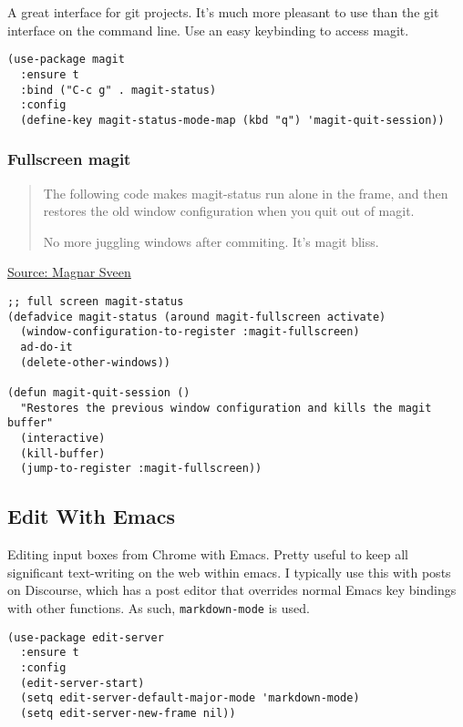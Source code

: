 \documentclass[11pt]{article}
\begin{document}
A great interface for git projects. It's much more pleasant to use
than the git interface on the command line. Use an easy keybinding to
access magit.

\begin{verbatim}
(use-package magit
  :ensure t
  :bind ("C-c g" . magit-status)
  :config
  (define-key magit-status-mode-map (kbd "q") 'magit-quit-session))
\end{verbatim}

\subsubsection{Fullscreen magit}
\label{sec-18-10-1}

\begin{quote}
The following code makes magit-status run alone in the frame, and then
restores the old window configuration when you quit out of magit.

No more juggling windows after commiting. It's magit bliss.
\end{quote}
\href{http://whattheemacsd.com/setup-magit.el-01.html}{Source: Magnar Sveen}

\begin{verbatim}
;; full screen magit-status
(defadvice magit-status (around magit-fullscreen activate)
  (window-configuration-to-register :magit-fullscreen)
  ad-do-it
  (delete-other-windows))

(defun magit-quit-session ()
  "Restores the previous window configuration and kills the magit buffer"
  (interactive)
  (kill-buffer)
  (jump-to-register :magit-fullscreen))
\end{verbatim}

\subsection{Edit With Emacs}
\label{sec-18-11}

Editing input boxes from Chrome with Emacs. Pretty useful to keep all
significant text-writing on the web within emacs. I typically use this
with posts on Discourse, which has a post editor that overrides normal
Emacs key bindings with other functions. As such, \verb~markdown-mode~ is
used.

\begin{verbatim}
(use-package edit-server
  :ensure t
  :config
  (edit-server-start)
  (setq edit-server-default-major-mode 'markdown-mode)
  (setq edit-server-new-frame nil))
\end{verbatim}
\end{document}
